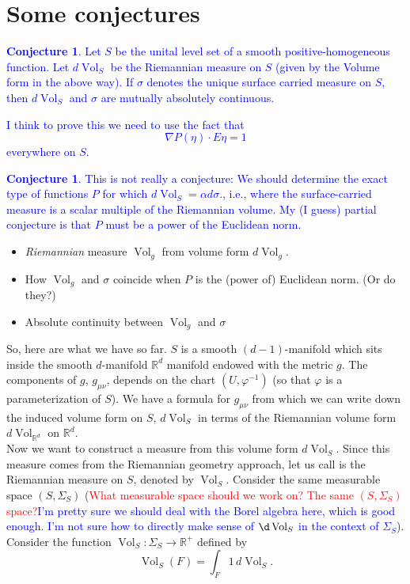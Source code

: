 \documentclass{article}
\theoremstyle{definition}
\newcommand{\R}{\mathbb{R}}
\theoremstyle{theorem}
\newtheorem{conjecture}[theorem]{Conjecture}
\newcommand{\Vol}{\operatorname{Vol}}
\begin{document}
\section{Some conjectures}
\textcolor{blue}{
\begin{conjecture}
Let $S$ be the unital level set of a smooth positive-homogeneous function. Let $d\Vol_S$ be the Riemannian measure on $S$ (given by the Volume form in the above way). If $\sigma$ denotes the unique surface carried measure on $S$, then $d\Vol_S$ and $\sigma$ are mutually absolutely continuous.
\end{conjecture}
I think to prove this we need to use the fact that
\begin{equation*}
\nabla P(\eta)\cdot E\eta=1
\end{equation*}
everywhere on $S$.
\begin{conjecture}
This is not really a conjecture: We should determine the exact type of functions $P$ for which $d\Vol_S=\alpha d\sigma.$, i.e., where the surface-carried measure is a scalar multiple of the Riemannian volume. My (I guess) partial conjecture is that $P$ must be a power of the Euclidean norm.
\end{conjecture}}






\begin{framed}
\begin{itemize}
    \item \textit{Riemannian} measure $\Vol_g$ from volume form $d\Vol_g$.
    \item How $\Vol_g$ and $\sigma$ coincide when $P$ is the (power of) Euclidean norm. (Or do they?)
    \item Absolute continuity between $\Vol_g$ and $\sigma$
\end{itemize}
\end{framed}

So, here are what we have so far. $S$ is a smooth $(d-1)$-manifold which sits inside the smooth $d$-manifold $\R^d$ manifold endowed with the metric $g$. The components of $g$, $g_{\mu\nu}$, depends on the chart $(U,\varphi^{-1})$ (so that $\varphi$ is a parameterization of $S$). We have a formula for $g_{\mu\nu}$ from which we can write down the induced volume form on $S$, $d\Vol_S$ in terms of the Riemannian volume form $d\Vol_{\R^d}$ on $\R^d$. \\

Now we want to construct a measure from this volume form $d\Vol_S$. Since this measure comes from the Riemannian geometry approach, let us call is the Riemannian measure on $S$, denoted by $\Vol_S$. Consider the same measurable space $(S,\Sigma_S)$ (\textcolor{red}{What measurable space should we work on? The same $(S,\Sigma_S)$ space?}\textcolor{blue}{I'm pretty sure we should deal with the Borel algebra here, which is good enough. I'm not sure how to directly make sense of $\d\Vol_S$ in the context of $\Sigma_S$}). Consider the function $\Vol_S : \Sigma_S \to \R^+$ defined by
\begin{equation*}
    \Vol_S(F) = \int_F 1\, d\Vol_S.
\end{equation*}
\end{document}
